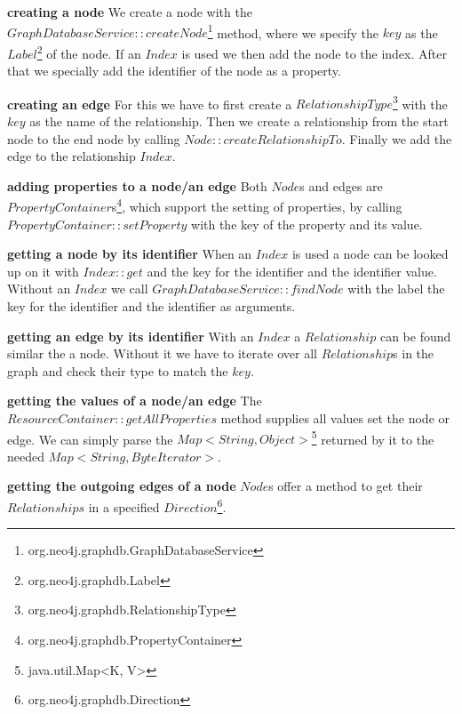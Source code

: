 \textbf{creating a node} \newline
We create a node with the $ GraphDatabaseService::createNode $\footnote{org.neo4j.graphdb.GraphDatabaseService} method,
where we specify the $ key $ as the $ Label $\footnote{org.neo4j.graphdb.Label} of the node.
If an $ Index $ is used we then add the node to the index.
After that we specially add the identifier of the node as a property.

\textbf{creating an edge} \newline
For this we have to first create a $ RelationshipType $\footnote{org.neo4j.graphdb.RelationshipType} with the $ key $ as the name of the relationship.
Then we create a relationship from the start node to the end node by calling $ Node::createRelationshipTo $.
Finally we add the edge to the relationship $ Index $.

\textbf{adding properties to a node/an edge} \newline
Both $ Node $s and edges are $ PropertyContainer $s\footnote{org.neo4j.graphdb.PropertyContainer},
which support the setting of properties,
by calling $ PropertyContainer::setProperty $ with the key of the property and its value.

\textbf{getting a node by its identifier} \newline
When an $ Index $ is used a node can be looked up on it with $ Index::get $ and the key for the identifier and the identifier value.
Without an $ Index $ we call $ GraphDatabaseService::findNode $ with the label the key for the identifier and the identifier as arguments.

\textbf{getting an edge by its identifier} \newline
With an $ Index $ a $ Relationship $ can be found similar the a node.
Without it we have to iterate over all $ Relationship $s in the graph and check their type to match the $ key $.

\textbf{getting the values of a node/an edge} \newline
The $ ResourceContainer::getAllProperties $ method supplies all values set the node or edge.
We can simply parse the $ Map<String, Object> $\footnote{java.util.Map<K, V>} returned by it to the needed $ Map<String, ByteIterator> $.

\textbf{getting the outgoing edges of a node} \newline
$ Node $s offer a method to get their $ Relationships $ in a specified $ Direction $\footnote{org.neo4j.graphdb.Direction}.

